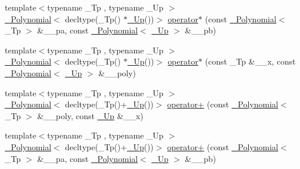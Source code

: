 \begin{DoxyCompactItemize}
\item 
{\footnotesize template$<$typename \+\_\+\+Tp , typename \+\_\+\+Up $>$ }\\\hyperlink{class____gnu__cxx_1_1__Polynomial}{\+\_\+\+Polynomial}$<$ decltype(\+\_\+\+Tp() $\ast$\hyperlink{namespace____gnu__cxx_ab693ea357b6429b331e0bf09f9442385}{\+\_\+\+Up}())$>$ \hyperlink{namespace____gnu__cxx_a2f76fd6f7c2c9e64fba1d5892844f26b}{operator$\ast$} (const \hyperlink{class____gnu__cxx_1_1__Polynomial}{\+\_\+\+Polynomial}$<$ \+\_\+\+Tp $>$ \&\+\_\+\+\_\+pa, const \hyperlink{class____gnu__cxx_1_1__Polynomial}{\+\_\+\+Polynomial}$<$ \hyperlink{namespace____gnu__cxx_ab693ea357b6429b331e0bf09f9442385}{\+\_\+\+Up} $>$ \&\+\_\+\+\_\+pb)
\item 
{\footnotesize template$<$typename \+\_\+\+Tp , typename \+\_\+\+Up $>$ }\\\hyperlink{class____gnu__cxx_1_1__Polynomial}{\+\_\+\+Polynomial}$<$ decltype(\+\_\+\+Tp() $\ast$\hyperlink{namespace____gnu__cxx_ab693ea357b6429b331e0bf09f9442385}{\+\_\+\+Up}())$>$ \hyperlink{namespace____gnu__cxx_ac79cfe2d37e5d8116fcf51911c21c253}{operator$\ast$} (const \+\_\+\+Tp \&\+\_\+\+\_\+x, const \hyperlink{class____gnu__cxx_1_1__Polynomial}{\+\_\+\+Polynomial}$<$ \hyperlink{namespace____gnu__cxx_ab693ea357b6429b331e0bf09f9442385}{\+\_\+\+Up} $>$ \&\+\_\+\+\_\+poly)
\item 
{\footnotesize template$<$typename \+\_\+\+Tp , typename \+\_\+\+Up $>$ }\\\hyperlink{class____gnu__cxx_1_1__Polynomial}{\+\_\+\+Polynomial}$<$ decltype(\+\_\+\+Tp()+\hyperlink{namespace____gnu__cxx_ab693ea357b6429b331e0bf09f9442385}{\+\_\+\+Up}())$>$ \hyperlink{namespace____gnu__cxx_a2b408e7a7e5d2ec6879b8e40f7f5de3e}{operator+} (const \hyperlink{class____gnu__cxx_1_1__Polynomial}{\+\_\+\+Polynomial}$<$ \+\_\+\+Tp $>$ \&\+\_\+\+\_\+poly, const \hyperlink{namespace____gnu__cxx_ab693ea357b6429b331e0bf09f9442385}{\+\_\+\+Up} \&\+\_\+\+\_\+x)
\item 
{\footnotesize template$<$typename \+\_\+\+Tp , typename \+\_\+\+Up $>$ }\\\hyperlink{class____gnu__cxx_1_1__Polynomial}{\+\_\+\+Polynomial}$<$ decltype(\+\_\+\+Tp()+\hyperlink{namespace____gnu__cxx_ab693ea357b6429b331e0bf09f9442385}{\+\_\+\+Up}())$>$ \hyperlink{namespace____gnu__cxx_ada8a28005b5f71563bec55c71e03029b}{operator+} (const \hyperlink{class____gnu__cxx_1_1__Polynomial}{\+\_\+\+Polynomial}$<$ \+\_\+\+Tp $>$ \&\+\_\+\+\_\+pa, const \hyperlink{class____gnu__cxx_1_1__Polynomial}{\+\_\+\+Polynomial}$<$ \hyperlink{namespace____gnu__cxx_ab693ea357b6429b331e0bf09f9442385}{\+\_\+\+Up} $>$ \&\+\_\+\+\_\+pb)

\end{DoxyCompactItemize}
